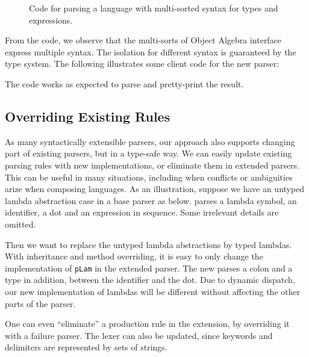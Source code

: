 \begin{figure}[ht]
\caption{Code for parsing a language with multi-sorted syntax for types and expressions.}
\label{fig:multi}
\end{figure}

From the code, we observe that the multi-sorts of Object Algebra interface
express multiple syntax. The isolation for different syntax
is guaranteed by the type system. The following illustrates some client code
for the new parser:

The code works as expected to parse and pretty-print the result.

\subsection{Overriding Existing Rules}

As many syntactically extensible parsers, our approach also supports
changing part of existing parsers, but in a type-safe way. We can
easily update existing parsing rules with new implementations, or
eliminate them in extended parsers. This can be useful in many
situations, including when conflicts or ambiguities arize when
composing languages.
As an illustration, suppose we have an untyped lambda abstraction case in a base parser as below.  parses a lambda symbol, an identifier, a dot and an expression in sequence. Some irrelevant details are omitted.


Then we want to replace the untyped lambda abstractions by typed
lambdas. With inheritance and method overriding, it is easy to only
change the implementation of \lstinline{pLam} in the extended parser.
The new  parses a colon and a type in addition,
between the identifier and the dot. Due to dynamic dispatch, our new
implementation of lambdas will be different without affecting the other parts of the parser.



One can even ``eliminate'' a production rule in the extension, by overriding it with a failure parser. The lexer can also be updated, since keywords and delimiters are represented by sets of strings.

